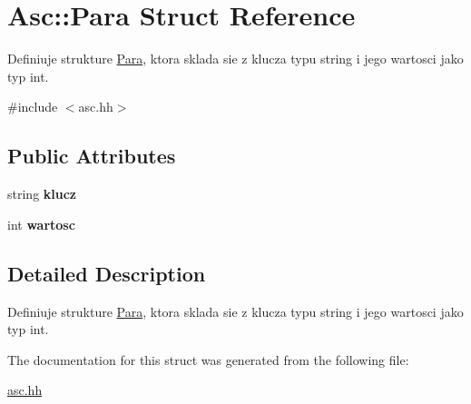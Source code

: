 \hypertarget{struct_asc_1_1_para}{\section{\-Asc\-:\-:\-Para \-Struct \-Reference}
\label{struct_asc_1_1_para}
}


\-Definiuje strukture \hyperlink{struct_asc_1_1_para}{\-Para}, ktora sklada sie z klucza typu string i jego wartosci jako typ int.  




{\ttfamily \#include $<$asc.\-hh$>$}

\subsection*{\-Public \-Attributes}
\begin{DoxyCompactItemize}
\item 
\hypertarget{struct_asc_1_1_para_a2153d2399f2aa476a9fb9065f6165512}{string {\bfseries klucz}}\label{struct_asc_1_1_para_a2153d2399f2aa476a9fb9065f6165512}

\item 
\hypertarget{struct_asc_1_1_para_a95d3ba45f4bd2214b5c1957e948869f2}{int {\bfseries wartosc}}\label{struct_asc_1_1_para_a95d3ba45f4bd2214b5c1957e948869f2}

\end{DoxyCompactItemize}


\subsection{\-Detailed \-Description}
\-Definiuje strukture \hyperlink{struct_asc_1_1_para}{\-Para}, ktora sklada sie z klucza typu string i jego wartosci jako typ int. 



\-The documentation for this struct was generated from the following file\-:\begin{DoxyCompactItemize}
\item 
\hyperlink{asc_8hh}{asc.\-hh}\end{DoxyCompactItemize}
